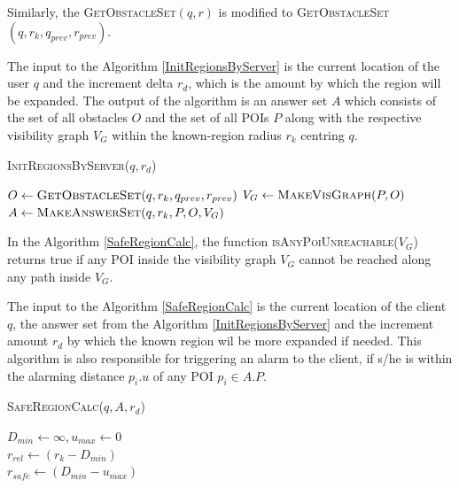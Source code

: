\documentclass{sig-alternate}
\begin{document}
Similarly, the \textsc{GetObstacleSet}$(q, r)$ is modified to \textsc{GetObstacleSet}$(q, r_k, q_{prev}, r_{prev})$.

The input to the Algorithm \ref{InitRegionsByServer} is the current location of the user $q$ and the increment delta $r_d$, which is the amount by which the region will be expanded. The output of the algorithm is an answer set $A$ which consists of the set of all obstacles $O$ and the set of all POIs $P$ along with the respective visibility graph $V_G$ within the known-region radius $r_{k}$ centring $q$.

\begin{algorithm}
\caption{\textsc{InitRegionsByServer}($q,r_d$)}
\label{InitRegionsByServer}

    
	 $O \gets \textsc{GetObstacleSet}(q, r_k, q_{prev}, r_{prev})$\;
	 $V_G \gets \textsc{MakeVisGraph}(P, O)$	\;
	 \Return $A \gets \textsc{MakeAnswerSet}(q, r_k, P, O, V_G)$ 
\end{algorithm}

In the Algorithm \ref{SafeRegionCalc}, the function \textsc{isAnyPoiUnreachable}($V_G$) returns true if any POI inside the visibility graph $V_G$ cannot be reached along any path inside $V_G$.

The input to the Algorithm \ref{SafeRegionCalc} is the current location of the client $q$, the answer set from the Algorithm \ref{InitRegionsByServer} and the increment amount $r_d$ by which the known region wil be more expanded if needed. This algorithm is also responsible for triggering an alarm to the client, if s/he is within the alarming distance $p_i.u$ of any POI $p_i \in A.P$.

\begin{algorithm}
\caption{\textsc{SafeRegionCalc}($q, A, r_d$)}
\label{SafeRegionCalc}
    
	
	 $D_{min} \gets \infty, u_{max} \gets 0$ \\
	 $r_{rel} \gets ( r_k - D_{min} )$\\
	 {
	}
	 \Return $r_{safe} \gets (D_{min} - u_{max})$ 
\end{algorithm}
\end{document}

